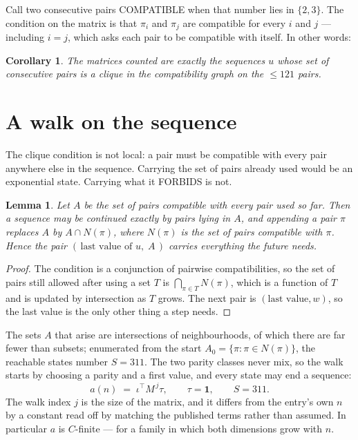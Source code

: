 \documentclass[11pt,a4paper]{article}
\theoremstyle{plain}
\newtheorem{lemma}[theorem]{Lemma}
\newtheorem{corollary}[theorem]{Corollary}
\theoremstyle{definition}
\begin{document}
Call two consecutive pairs COMPATIBLE when that number lies in $\{2,3\}$. The condition on the
matrix is that $\pi_i$ and $\pi_j$ are compatible for every $i$ and $j$ --- including $i=j$,
which asks each pair to be compatible with itself. In other words:

\begin{corollary}
The matrices counted are exactly the sequences $u$ whose set of consecutive pairs is a clique in
the compatibility graph on the $\le 121$ pairs.
\end{corollary}

\section{A walk on the sequence}

The clique condition is not local: a pair must be compatible with every pair anywhere else in
the sequence. Carrying the set of pairs already used would be an exponential state. Carrying
what it FORBIDS is not.

\begin{lemma}\label{lem:lump}
Let $A$ be the set of pairs compatible with every pair used so far. Then a sequence may be
continued exactly by pairs lying in $A$, and appending a pair $\pi$ replaces $A$ by
$A\cap N(\pi)$, where $N(\pi)$ is the set of pairs compatible with $\pi$. Hence the pair
$(\,\text{last value of }u,\;A\,)$ carries everything the future needs.
\end{lemma}

\begin{proof}
The condition is a conjunction of pairwise compatibilities, so the set of pairs still allowed
after using a set $T$ is $\bigcap_{\pi\in T}N(\pi)$, which is a function of $T$ and is updated
by intersection as $T$ grows. The next pair is $(\text{last value},w)$, so the last value is
the only other thing a step needs.
\end{proof}

The sets $A$ that arise are intersections of neighbourhoods, of which there are far fewer than
subsets; enumerated from the start $A_0=\{\pi:\pi\in N(\pi)\}$, the reachable states number
$S=311$. The two parity classes never mix, so the walk starts by choosing a parity and a first
value, and every state may end a sequence:
\[
a(n)\;=\;\iota^{\!\top}M^{\,j}\tau ,\qquad \tau=\mathbf{1},\qquad S=311.
\]
The walk index $j$ is the size of the matrix, and it differs from the entry's own $n$ by a
constant read off by matching the published terms rather than assumed. In particular $a$ is
$C$-finite --- for a family in which both dimensions grow with $n$.
\end{document}
